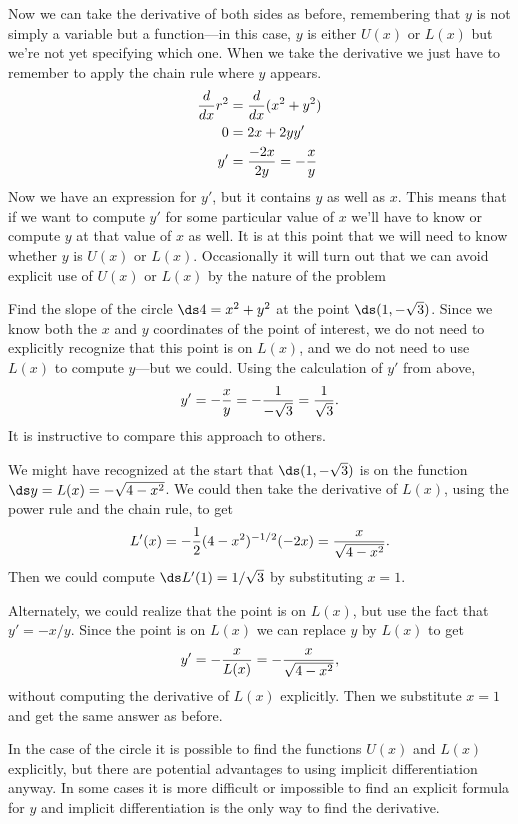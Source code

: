 Now we can take the derivative of both sides as before, remembering
that $y$ is not simply a variable but a function---in this case, $y$
is either $U(x)$ or $L(x)$ but we're not yet specifying which one.
When we take the derivative we just have to remember to apply the
chain rule where $y$ appears.
\begin{align*}
{d\over dx}r^2&={d\over dx}(x^2+y^2) \\
0&=2x+2yy' \\
y'&={-2x\over 2y}=-{x\over y} \\
\end{align*}
Now we have an expression for $y'$, but it contains $y$ as well as
$x$. This means that if we want to compute $y'$ for some particular
value of $x$ we'll have to know or compute $y$ at that value of $x$ as
well. It is at this point that we will need to know whether $y$ is
$U(x)$ or $L(x)$. Occasionally it will turn out that we can avoid
explicit use of $U(x)$ or $L(x)$ by the nature of the problem

\begin{example}
Find the slope of the circle $\ds 4=x^2+y^2$ at the point
$\ds (1,-\sqrt{3})$. Since we know both the $x$ and $y$ coordinates of the
point of interest, we do not need to explicitly recognize that this
point is on $L(x)$, and we do not need to use $L(x)$ to compute
$y$---but we could. Using the calculation of $y'$ from above, 
$$y'=-{x\over y}=-{1\over -\sqrt{3}}={1\over \sqrt{3}}.$$
It is instructive to compare this approach to others.

We might have recognized at the start that $\ds (1,-\sqrt{3})$ is on the
function $\ds y=L(x)=-\sqrt{4-x^2}$. We could then take the derivative of
$L(x)$, using the power rule and the chain rule, to get
$$L'(x)=-{1\over 2}(4-x^2)^{-1/2}(-2x)={x\over\sqrt{4-x^2}}.$$
Then we could compute $\ds L'(1)=1/\sqrt{3}$ by substituting $x=1$.

Alternately, we could realize that the point is on $L(x)$, but use the
fact that $y'=-x/y$. Since the point is on $L(x)$ we can replace $y$
by $L(x)$ to get
$$y'=-{x\over L(x)}=-{x\over \sqrt{4-x^2}},$$
without computing the derivative of $L(x)$ explicitly. Then we
substitute $x=1$ and get the same answer as before.
\end{example}

In the case of the circle it is possible to find the functions $U(x)$
and $L(x)$ explicitly, but there are potential advantages to using
implicit differentiation anyway. In some cases it is more difficult or
impossible to find an explicit formula for $y$ and implicit
differentiation is the only way to find the derivative.

